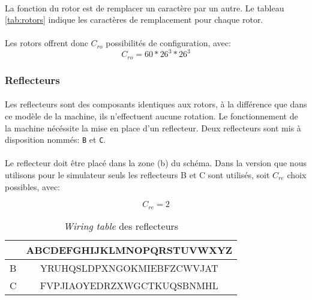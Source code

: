 \documentclass[letterpaper]{article}
\begin{document}
\paragraph{}
La fonction du rotor est de remplacer un caractère par un autre. Le tableau \ref{tab:rotors} indique les caractères de remplacement pour chaque rotor.

\paragraph{}
Les rotors offrent donc $C_{ro}$ possibilités de configuration, avec:
\[
  C_{ro} = 60*26^3*26^3
\]

\subsubsection{Reflecteurs}

\paragraph{}

Les reflecteurs sont des composants identiques aux rotors, à la différence que dans ce modèle de la machine, ils n'effectuent aucune rotation. Le fonctionnement de la machine nécéssite la mise en place d'un reflecteur. Deux reflecteurs sont mis à disposition nommés: \texttt{B} et \texttt{C}.

\paragraph{}
 
Le reflecteur doit être placé dans la zone (b) du schéma. Dans la version que nous utilisons pour le simulateur seuls les reflecteurs B et C sont utilisés, soit $C_{re}$ choix possibles, avec:

\[
C_{re} = 2
\]

\def\arraystretch{1.8}
\begin{table}
    \centering
    \begin{tabular}{|c|c|}
        \hline
         & ABCDEFGHIJKLMNOPQRSTUVWXYZ
        \\ \hline
         B & YRUHQSLDPXNGOKMIEBFZCWVJAT
        \\ \hline
         C & FVPJIAOYEDRZXWGCTKUQSBNMHL
        \\ \hline
    \end{tabular}
    \caption{\textit{Wiring table} des reflecteurs}
    \label{tab:reflectors}
\end{table}
\end{document}
